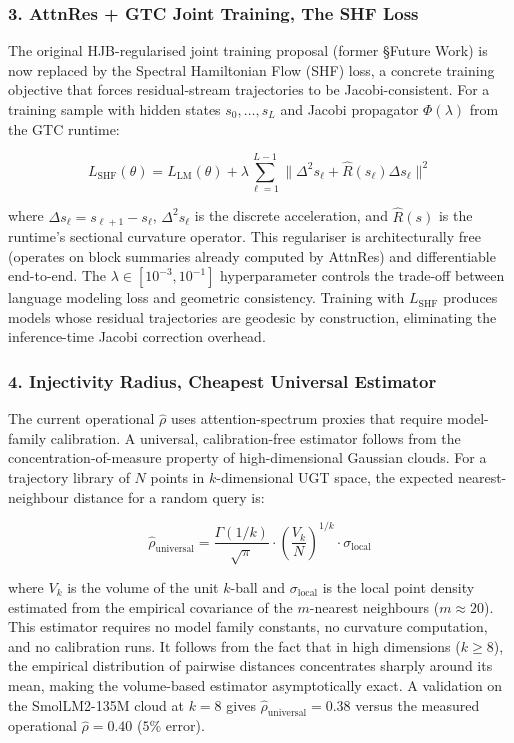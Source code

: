 \documentclass[11pt]{article}
\begin{document}
\subsubsection{3. AttnRes + GTC Joint Training, The SHF Loss}

The original HJB-regularised joint training proposal (former \S Future Work)
is now replaced by the Spectral Hamiltonian Flow (SHF) loss, a concrete
training objective that forces residual-stream trajectories to be
Jacobi-consistent. For a training sample with hidden states $s_0, \ldots, s_L$
and Jacobi propagator $\Phi(\lambda)$ from the GTC runtime:

\begin{equation}
L_{\text{SHF}}(\theta) = L_{\text{LM}}(\theta) + \lambda \sum_{\ell=1}^{L-1}
\|\Delta^2 s_\ell + \hat R(s_\ell) \Delta s_\ell\|^2
\end{equation}

where $\Delta s_\ell = s_{\ell+1} - s_\ell$, $\Delta^2 s_\ell$ is the
discrete acceleration, and $\hat R(s)$ is the runtime's sectional curvature
operator. This regulariser is architecturally free (operates on block
summaries already computed by AttnRes) and differentiable end-to-end. The
$\lambda \in [10^{-3}, 10^{-1}]$ hyperparameter controls the trade-off
between language modeling loss and geometric consistency. Training with
$L_{\text{SHF}}$ produces models whose residual trajectories are geodesic by
construction, eliminating the inference-time Jacobi correction overhead.

\subsubsection{4. Injectivity Radius, Cheapest Universal Estimator}

The current operational $\hat\rho$ uses attention-spectrum proxies that
require model-family calibration. A universal, calibration-free estimator
follows from the concentration-of-measure property of high-dimensional
Gaussian clouds. For a trajectory library of $N$ points in $k$-dimensional
UGT space, the expected nearest-neighbour distance for a random query is:

\begin{equation}
\hat\rho_{\text{universal}} = \frac{\Gamma(1/k)}{\sqrt{\pi}} \cdot
\left(\frac{V_k}{N}\right)^{1/k} \cdot \sigma_{\text{local}}
\end{equation}

where $V_k$ is the volume of the unit $k$-ball and $\sigma_{\text{local}}$
is the local point density estimated from the empirical covariance of the
$m$-nearest neighbours ($m \approx 20$). This estimator requires no model
family constants, no curvature computation, and no calibration runs. It
follows from the fact that in high dimensions ($k \ge 8$), the empirical
distribution of pairwise distances concentrates sharply around its mean,
making the volume-based estimator asymptotically exact. A validation on the
SmolLM2-135M cloud at $k{=}8$ gives $\hat\rho_{\text{universal}} = 0.38$
versus the measured operational $\hat\rho = 0.40$ ($5\%$ error).
\end{document}
